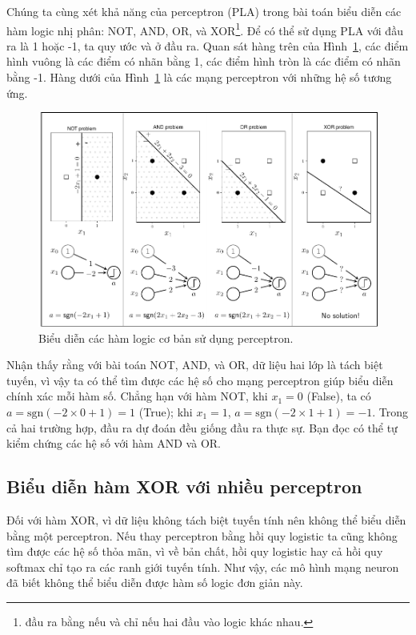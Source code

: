 Chúng ta cùng xét khả năng của perceptron (PLA) trong bài toán biểu
diễn các hàm logic nhị phân: NOT, AND, OR, và XOR\footnote{đầu ra bằng 
nếu và chỉ nếu hai đầu vào logic khác nhau.}. Để có thể sử dụng PLA với
đầu ra là 1 hoặc -1, ta quy ước  và  ở đầu ra. Quan sát hàng trên của Hình~\ref{fig:14_1}, các điểm
hình vuông là các điểm có nhãn bằng 1, các điểm hình tròn là các
điểm có nhãn bằng -1. Hàng dưới của Hình~\ref{fig:14_1} là các mạng
perceptron với những hệ số tương ứng.
\begin{figure}[t]
\vspace{.1in}
\centering
\includegraphics[width = \textwidth]{Chapters/05_NeuralNetworks/14_mlp/latex/logic_nn.pdf}
\caption[]{Biểu diễn các hàm logic cơ bản sử dụng perceptron.}
\label{fig:14_1}
\end{figure}
Nhận thấy rằng với bài toán NOT, AND, và OR, dữ liệu hai lớp là tách biệt tuyến, vì vậy ta có thể tìm được các hệ số cho mạng perceptron giúp biểu diễn
chính xác mỗi hàm số. Chẳng hạn với hàm NOT, khi $x_1 = 0$ (False), ta có $a =
\text{sgn}(-2 \times 0+1) = 1$ (True); khi $x_1 = 1$, $a = \text{sgn}(-2\times 1 + 1) =
-1$. Trong cả hai trường hợp, đầu ra dự đoán đều giống đầu ra thực sự. Bạn
đọc có thể tự kiểm chứng các hệ số với hàm AND và OR.

\subsection{Biểu diễn hàm XOR với nhiều perceptron}
Đối với hàm XOR, vì dữ liệu không tách biệt tuyến tính nên không thể biểu diễn
bằng một perceptron. Nếu thay perceptron bằng hồi quy logistic ta cũng không tìm
được các hệ số thỏa mãn, vì về bản chất, hồi quy logistic hay cả hồi quy softmax
chỉ tạo ra các ranh giới tuyến tính. Như vậy, các mô hình mạng neuron đã biết
không thể biểu diễn được hàm số logic đơn giản này.



